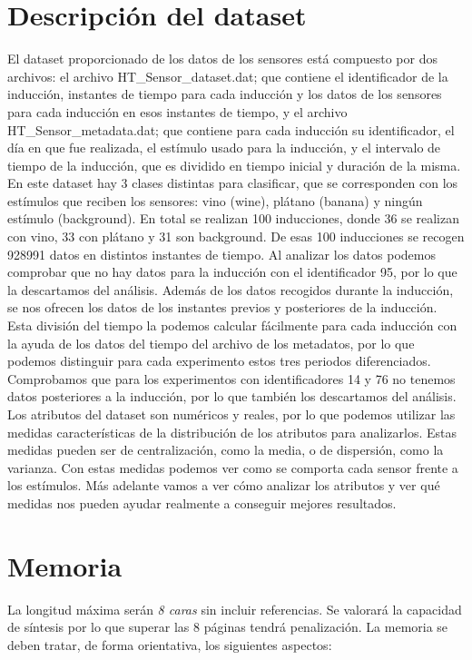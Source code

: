 \documentclass{esannV2}
\begin{document}
\section{Descripción del dataset}
El dataset proporcionado de los datos de los sensores está compuesto por dos archivos: el archivo HT\_Sensor\_dataset.dat; que contiene el identificador de la inducción, instantes de tiempo para cada inducción y los datos de los sensores para cada inducción en esos instantes de tiempo, y el archivo HT\_Sensor\_metadata.dat; que contiene para cada inducción su identificador, el día en que fue realizada, el estímulo usado para la inducción, y el intervalo de tiempo de la inducción, que es dividido en tiempo inicial y duración de la misma. 
En este dataset hay 3 clases distintas para clasificar, que se corresponden con los estímulos que reciben los sensores:  vino (wine), plátano (banana) y ningún estímulo (background). En total se realizan 100 inducciones, donde  36 se realizan con vino, 33 con plátano y 31 son background. De esas 100 inducciones se recogen 928991 datos en distintos instantes de tiempo. Al analizar los datos podemos comprobar que no hay datos para la inducción con el identificador 95, por lo que la descartamos del análisis. Además de los datos recogidos durante la inducción, se nos ofrecen los datos de los instantes previos y posteriores de la inducción. Esta división del tiempo la podemos calcular fácilmente para cada inducción con la ayuda de los datos del tiempo del archivo de los metadatos, por lo que podemos distinguir para cada experimento estos tres periodos diferenciados. Comprobamos que para los experimentos con identificadores 14 y 76 no tenemos datos posteriores a la inducción, por lo que también los descartamos del análisis.
Los atributos del dataset son numéricos y reales, por lo que podemos utilizar las medidas características de la distribución de los atributos para analizarlos. Estas medidas pueden ser de centralización, como la media, o de dispersión, como la varianza. Con estas medidas podemos ver como se comporta cada sensor frente a los estímulos. Más adelante vamos a ver cómo analizar los atributos y ver qué medidas nos pueden ayudar realmente a conseguir mejores resultados.

\section{Memoria}
La longitud máxima serán \emph{8 caras} sin incluir referencias. Se valorará la
capacidad de síntesis por lo que superar las 8 páginas tendrá penalización. La
memoria se deben tratar, de forma orientativa, los siguientes aspectos:
\end{document}
